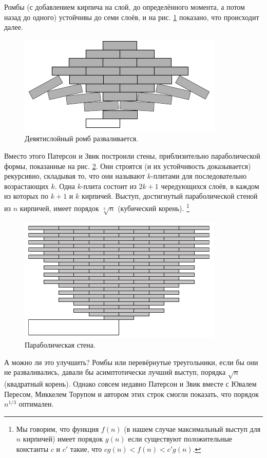 Ромбы (с добавлением кирпича на слой, до определённого момента, а потом назад до одного) устойчивы до семи слоёв, и на рис. \ref{pic:kirpich6} показано, что происходит далее.

\begin{figure}[htb!]
\centering
\includegraphics[scale=1]{pics/kirpich6}
\caption{Девятислойный ромб разваливается.}
\label{pic:kirpich6}
\end{figure}

Вместо этого Патерсон и Звик построили стены, приблизительно параболической формы, показанные на рис. \ref{pic:kirpich7}.
Они строятся (и их устойчивость доказывается) рекурсивно, складывая то, что они называют $k$-плитами для последовательно возрастающих $k$.
Одна $k$-плита состоит из $2k + 1$ чередующихся слоёв, в каждом из которых по $k + 1$ и $k$ кирпичей.
Выступ, достигнутый параболической стеной из $n$ кирпичей, имеет порядок $\sqrt[3]{n}$ (кубический корень).%
\footnote{Мы говорим, что функция $f (n)$ (в нашем случае максимальный выступ для $n$ кирпичей) имеет порядок $g(n)$ если существуют положительные константы $c$ и $c'$ такие, что $cg(n) < f (n) < c' g(n)$.}

\begin{figure}[htb!]
\centering
\includegraphics[scale=1]{pics/kirpich7}
\caption{Параболическая стена.}
\label{pic:kirpich7}
\end{figure}

А можно ли это улучшить?
Ромбы или перевёрнутые треугольники, если бы они не разваливались, давали бы асимптотически лучший выступ, порядка $\sqrt{n}$ (квадратный корень).
Однако совсем недавно Патерсон и Звик вместе с Ювалем Пересом, Миккелем Торупом и автором этих строк \cite{48} смогли показать, что порядок $n^{1/3}$ оптимален.

